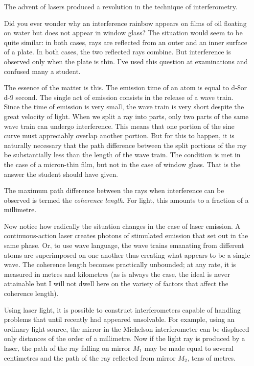 The advent of lasers produced a revolution in the technique of interferometry.

Did you ever wonder why an interference rainbow ap­pears on films of oil floating on water but does not appear in window glass? The situation would seem to be quite similar: in both cases, rays are reflected from an outer and an inner surface of a plate. In both cases, the two reflected rays combine. But interference is observed only when the plate is thin. I’ve used this question at exami­nations and confused many a student.

The essence of the matter is this. The emission time of an atom is equal to \num{d-8}or \num{d-9} second. The single act of emission consists in the release of a wave train. Since the time of emission is very small, the wave train is very short despite the great velocity of light. When we split a ray into parts, only two parts of the same wave train can undergo interference. This means that one portion of the sine curve must appreciably overlap another por­tion. But for this to happen, it is naturally necessary that the path difference between the split portions of the ray be substantially less than the length of the wave train. The condition is met in the case of a micron-thin film, but not in the case of window glass. That is the answer the student should have given.

The maximum path difference between the rays when interference can be observed is termed the \emph{coherence length}. For light, this amounts to a fraction of a millimetre.

Now notice how radically the situation changes in the case of laser emission. A continuous-action laser creates photons of stimulated emission that set out in the same phase. Or, to use wave language, the wave trains ema­nating from different atoms are superimposed on one another thus creating what appears to be a single wave. The coherence length becomes practically unbounded; at any rate, it is measured in metres and kilometres (as is always the case, the ideal is never attainable but I will not dwell here on the variety of factors that affect the coherence length).


Using laser light, it is possible to construct interfer­ometers capable of handling problems that until recently had appeared unsolvable. For example, using an ordinary light source, the mirror in the Michelson interferometer can be displaced only distances of the order of a millimetre. Now if the light ray is produced by a laser, the path of the ray falling on mirror $M_{1}$ may be made equal to several centimetres and the path of the ray reflected from mirror $M_{2}$, tens of metres.


